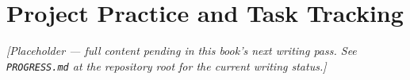 \chapter{Project Practice and Task Tracking}
\label{ch:project-practice}

\emph{[Placeholder --- full content pending in this book's next writing pass. See \texttt{PROGRESS.md} at the repository root for the current writing status.]}
